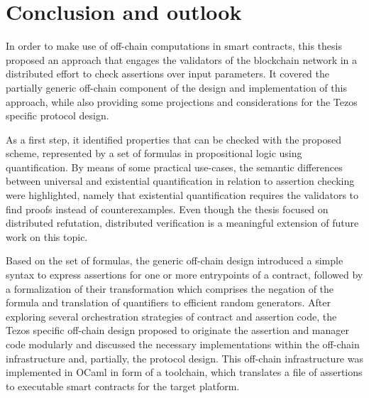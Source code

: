 \chapter{Conclusion and outlook}\label{chap:conclusion}
In order to make use of off-chain computations in smart contracts, this thesis proposed an approach that engages the validators of the blockchain network in a distributed effort to check assertions over input parameters. It covered the partially generic off-chain component of the design and implementation of this approach, while also providing some projections and considerations for the Tezos specific protocol design.

As a first step, it identified properties that can be checked with the proposed scheme, represented by a set of formulas in propositional logic using quantification. By means of some practical use-cases, the semantic differences between universal and existential quantification in relation to assertion checking were highlighted, namely that existential quantification requires the validators to find proofs instead of counterexamples. Even though the thesis focused on distributed refutation, distributed verification is a meaningful extension of future work on this topic.

Based on the set of formulas, the generic off-chain design introduced a simple syntax to express assertions for one or more entrypoints of a contract, followed by a formalization of their transformation which comprises the negation of the formula and translation of quantifiers to efficient random generators. After exploring several orchestration strategies of contract and assertion code, the Tezos specific off-chain design proposed to originate the assertion and manager code modularly and discussed the necessary implementations within the off-chain infrastructure and, partially, the protocol design. This off-chain infrastructure was implemented in OCaml in form of a toolchain, which translates a file of assertions to executable smart contracts for the target platform.\\






